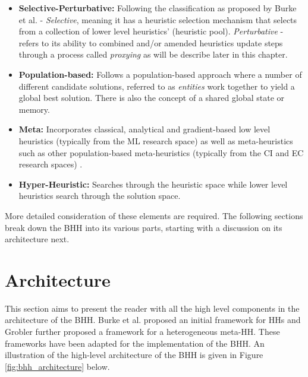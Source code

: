 \begin{itemize}
    \item \textbf{Selective-Perturbative:} Following the classification as proposed by Burke et al. \cite{ref:burke:2010} - \textit{Selective}, meaning it has a heuristic selection mechanism that selects from a collection of lower level heuristics' (heuristic pool). \textit{Perturbative} - refers to its ability to combined and/or amended heuristics update steps through a process called \textit{proxying} as will be describe later in this chapter.
    \item \textbf{Population-based:} Follows a population-based approach where a number of different candidate solutions, referred to as \textit{entities} work together to yield a global best solution. There is also the concept of a shared global state or memory.
    \item \textbf{Meta:} Incorporates classical, analytical and  gradient-based low level heuristics (typically from the \ac{ML} research space) as well as meta-heuristics such as other population-based meta-heuristics (typically from the \ac{CI} and \ac{EC} research spaces) .
    \item \textbf{Hyper-Heuristic:} Searches through the heuristic space while lower level heuristics search through the solution space.
\end{itemize}

More detailed consideration of these elements are required. The following sections break down the \Ac{BHH} into its various parts, starting with a discussion on its architecture next.


\section{Architecture}
\label{sec:bhh:architecture}

This section aims to present the reader with all the high level components in the architecture of the \Ac{BHH}. Burke et al. \cite{ref:burke:2010} proposed an initial framework for \acp{HH} and Grobler \cite{ref:grobler:2015} further proposed a framework for a heterogeneous meta-\ac{HH}. These frameworks have been adapted for the implementation of the \Ac{BHH}. An illustration of the high-level architecture of the \Ac{BHH} is given in Figure \ref{fig:bhh_architecture} below.

